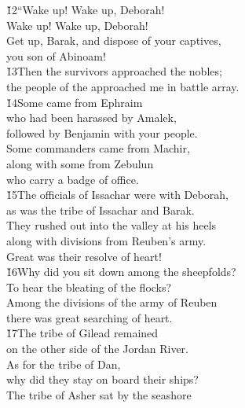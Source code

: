\begin{poetry}
\poeml \v{12}``Wake up! Wake up, Deborah! \\
\poemll    Wake up! Wake up, Deborah! \\
\poeml Get up, Barak, and dispose of your captives, \\
\poemll    you son of Abinoam! \\
\poeml \v{13}Then the survivors approached the nobles; \\
\poemll    the people of the  approached me in battle array. \\
\poeml \v{14}Some came from Ephraim \\
\poemll    who had been harassed by Amalek, \\
\poemlll       followed by Benjamin with your people. \\
\poeml Some commanders came from Machir, \\
\poemll    along with some from Zebulun \\
\poemlll       who carry a badge of office. \\
\poeml \v{15}The officials of Issachar were with Deborah, \\
\poemll    as was the tribe of Issachar and Barak. \\
\poeml They rushed out into the valley at his heels \\
\poemll    along with divisions from Reuben's army. \\
\poemlll       Great was their resolve of heart! \\
\poeml \v{16}Why did you sit down among the sheepfolds? \\
\poemll    To hear the bleating of the flocks? \\
\poeml Among the divisions of the army of Reuben \\
\poemll    there was great searching of heart. \\
\poeml \v{17}The tribe of Gilead remained \\
\poemll    on the other side of the Jordan River. \\
\poeml As for the tribe of Dan, \\
\poemll    why did they stay on board their ships? \\
\poeml The tribe of Asher sat by the seashore \\

\end{poetry}
